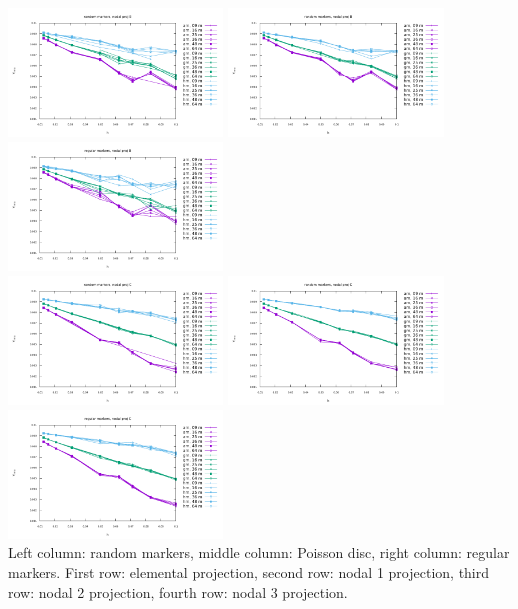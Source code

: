 \begin{center}
\includegraphics[width=5.7cm]{python_codes/fieldstone_13/results/vrms_rand_proj3} 
\includegraphics[width=5.7cm]{python_codes/fieldstone_13/results/vrms_poissondisc_proj3} 
\includegraphics[width=5.7cm]{python_codes/fieldstone_13/results/vrms_reg_proj3}\\
\includegraphics[width=5.7cm]{python_codes/fieldstone_13/results/vrms_rand_proj4} 
\includegraphics[width=5.7cm]{python_codes/fieldstone_13/results/vrms_poissondisc_proj4} 
\includegraphics[width=5.7cm]{python_codes/fieldstone_13/results/vrms_reg_proj4}\\
{\captionfont Left column: random markers, middle column: Poisson disc, 
right column: regular markers.
First row: elemental projection, second row: nodal 1 projection, 
third row: nodal 2 projection, fourth row: nodal 3 projection. }
\end{center}

